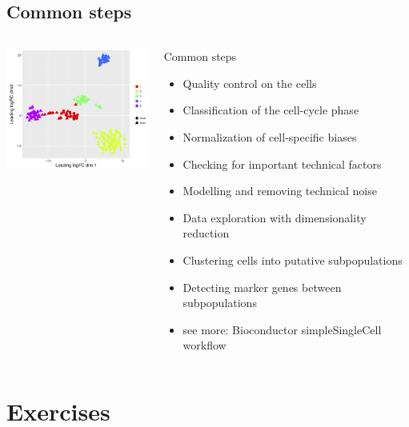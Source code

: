 \documentclass{beamer}\usepackage[]{graphicx}\usepackage[]{color}
\begin{document}
\subsection{Common steps}
\begin{frame}
\begin{columns}
\begin{column}{0.48\textwidth}
\centering
\includegraphics[width=5cm]{Images/scRNAseq_cluster.jpg}
\end{column}
\begin{column}{0.48\textwidth}
Common steps
\begin{itemize}
\footnotesize
  \item Quality control on the cells
  \item Classification of the cell-cycle phase
  \item Normalization of cell-specific biases
  \item Checking for important technical factors
  \item Modelling and removing technical noise
  \item Data exploration with dimensionality reduction
  \item Clustering cells into putative subpopulations
  \item Detecting marker genes between subpopulations
  \item see more: Bioconductor simpleSingleCell workflow
\end{itemize}
\end{column}
\end{columns}
\end{frame}

\section{Exercises}
\end{document}
